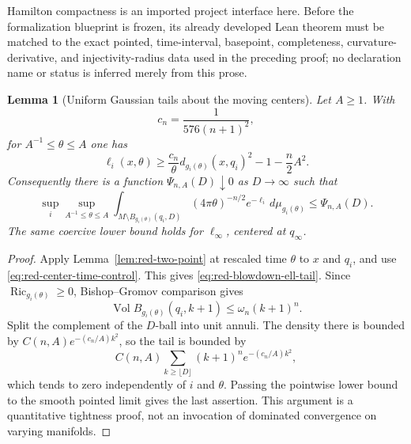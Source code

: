 \documentclass[10pt]{coll-l}
\newtheorem{lemma}[theorem]{Lemma}
\theoremstyle{definition}
\theoremstyle{remark}
\numberwithin{section}{chapter}
\numberwithin{equation}{chapter}
\newcommand{\Ric}{\operatorname{Ric}}
\newcommand{\Vol}{\operatorname{Vol}}
\begin{document}
Hamilton compactness is an imported project interface here.  Before the
formalization blueprint is frozen, its already developed Lean theorem must
be matched to the exact pointed, time-interval, basepoint, completeness,
curvature-derivative, and injectivity-radius data used in the preceding
proof; no declaration name or status is inferred merely from this prose.

\begin{lemma}[Uniform Gaussian tails about the moving centers]
\label{lem:red-blowdown-Gaussian-tail}
Let $A\geq1$.  With
\begin{equation}
                       c_n=\frac1{576(n+1)^2},           \label{eq:red-cn}
\end{equation}
for $A^{-1}\leq\theta\leq A$ one has
\begin{equation}
 \ell_i(x,\theta)
 \geq\frac{c_n}{\theta}d_{g_i(\theta)}(x,q_i)^2
       -1-\frac n2A^2.                                  \label{eq:red-blowdown-ell-tail}
\end{equation}
Consequently there is a function $\Psi_{n,A}(D)\downarrow0$ as
$D\to\infty$ such that
\begin{equation}
 \sup_i\sup_{A^{-1}\leq\theta\leq A}
 \int_{M\setminus B_{g_i(\theta)}(q_i,D)}
       (4\pi\theta)^{-n/2}e^{-\ell_i}\,d\mu_{g_i(\theta)}
 \leq\Psi_{n,A}(D).                                    \label{eq:red-blowdown-uniform-tail}
\end{equation}
The same coercive lower bound holds for $\ell_\infty$, centered at
$q_\infty$.
\end{lemma}

\begin{proof}
Apply Lemma~\ref{lem:red-two-point} at rescaled time $\theta$ to $x$ and
$q_i$, and use \eqref{eq:red-center-time-control}.  This gives
\eqref{eq:red-blowdown-ell-tail}.  Since $\Ric_{g_i(\theta)}\geq0$,
Bishop--Gromov comparison gives
\begin{equation}
        \Vol B_{g_i(\theta)}(q_i,k+1)\leq\omega_n(k+1)^n.
                                                               \label{eq:red-Bishop-Euclidean-upper}
\end{equation}
Split the complement of the $D$-ball into unit annuli.  The density there is
bounded by $C(n,A)e^{-(c_n/A)k^2}$, so the tail is bounded by
\begin{equation}
 C(n,A)\sum_{k\geq\lfloor D\rfloor}(k+1)^n
                   e^{-(c_n/A)k^2},                    \label{eq:red-Gaussian-annular-sum}
\end{equation}
which tends to zero independently of $i$ and $\theta$.  Passing the pointwise
lower bound to the smooth pointed limit gives the last assertion.  This
argument is a quantitative tightness proof, not an invocation of dominated
convergence on varying manifolds.
\end{proof}
\end{document}
